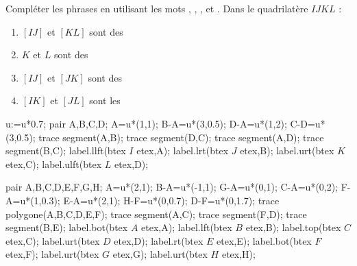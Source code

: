 \begin{exercice*} %
   Compléter les phrases en utilisant les mots ,
      , ,  et  .
   Dans le quadrilatère $IJKL$ :
   \begin{enumerate}
      \item $[IJ]$ et $[KL]$ sont des \pointilles \smallskip
      \item $K$ et $L$ sont des \pointilles \smallskip
      \item $[IJ]$ et $[JK]$ sont des \pointilles \smallskip
      \item $[IK]$ et $[JL]$ sont les \pointilles \smallskip
   \end{enumerate}

   \begin{minipage}{0.5\linewidth}
      \begin{Geometrie}[CoinHD={(6u,4u)}]
         u:=u*0.7;
         pair A,B,C,D;
         A=u*(1,1);
         B-A=u*(3,0.5);
         D-A=u*(1,2);
         C-D=u*(3,0.5);
         trace segment(A,B);
         trace segment(D,C);
         trace segment(A,D);
         trace segment(B,C);
         label.llft(btex $I$ etex,A);
         label.lrt(btex $J$ etex,B);
         label.urt(btex $K$ etex,C);
         label.ulft(btex $L$ etex,D);
     \end{Geometrie}
   \end{minipage}
   \begin{minipage}{0.5\linewidth}
      \begin{Geometrie}[CoinHD={(6u,4u)}]
         pair A,B,C,D,E,F,G,H;
         A=u*(2,1);
         B-A=u*(-1,1);
         G-A=u*(0,1);
         C-A=u*(0,2);
         F-A=u*(1,0.3);
         E-A=u*(2,1);
         H-F=u*(0,0.7);
         D-F=u*(0,1.7);
         trace polygone(A,B,C,D,E,F);
         trace segment(A,C);
         trace segment(F,D);
         trace segment(B,E);
         label.bot(btex $A$ etex,A);
         label.lft(btex $B$ etex,B);
         label.top(btex $C$ etex,C);
         label.urt(btex $D$ etex,D);
         label.rt(btex $E$ etex,E);
         label.bot(btex $F$ etex,F);
         label.urt(btex $G$ etex,G);
         label.urt(btex $H$ etex,H);
     \end{Geometrie}
   \end{minipage} 
\end{exercice*}
